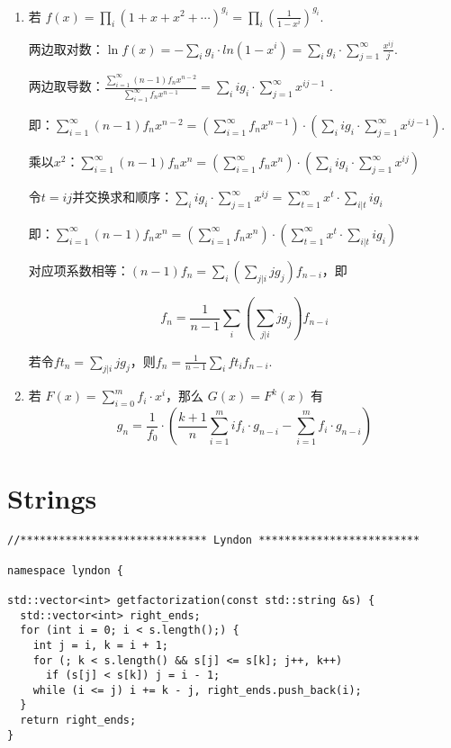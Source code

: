 \documentclass[6pt]{article}
\begin{document}
\begin{multicols}{2}
  \begin{enumerate}
    \item 若 $f(x)=\prod_i(1+x+x^2+\cdots)^{g_i}=\prod_i(\frac1{1-x^i})^{g_i}$.

          两边取对数：$\ln f(x)=-\sum_i g_i\cdot ln(1-x^i)=\sum_ig_i\cdot\sum_{j=1}^\infty\frac{x^{ij}}j$.

          两边取导数：$\frac{\sum_{i=1}^\infty(n-1)f_nx^{n-2}}{\sum_{i=1}^\infty f_nx^{n-1}}=\sum_iig_i\cdot\sum_{j=1}^\infty x^{ij-1}$ .

          即：$\sum_{i=1}^\infty(n-1)f_nx^{n-2}=(\sum_{i=1}^\infty f_nx^{n-1})\cdot(\sum_iig_i\cdot\sum_{j=1}^\infty x^{ij-1})$.

          乘以$x^2$：$\sum_{i=1}^\infty(n-1)f_nx^n=(\sum_{i=1}^\infty f_nx^n)\cdot(\sum_iig_i\cdot\sum_{j=1}^\infty x^{ij})$

          令$t=ij$并交换求和顺序：$\sum_iig_i\cdot\sum_{j=1}^\infty x^{ij}=\sum_{t=1}^\infty x^t\cdot\sum_{i|t}ig_i$

          即：$\sum_{i=1}^\infty(n-1)f_nx^n=(\sum_{i=1}^\infty f_nx^n)\cdot(\sum_{t=1}^\infty x^t\cdot\sum_{i|t}ig_i)$

          对应项系数相等：$(n-1)f_n=\sum_i(\sum_{j|i}jg_j)f_{n-i}$，即

          $$f_n=\frac1{n-1}\sum_i(\sum_{j|i}jg_j)f_{n-i}$$

          若令$ft_n=\sum_{j|i}jg_j$，则$f_n=\frac1{n-1}\sum_ift_if_{n-i}$.
    \item 若 $F(x)=\sum_{i=0}^{m}f_i\cdot x^i$，那么 $G(x)=F^k(x)$ 有
          $$g_n=\frac{1}{f_0}\cdot \left(\frac{k+1}{n}\sum_{i=1}^{m}if_i\cdot g_{n-i}-\sum_{i=1}^{m}f_i\cdot g_{n-i} \right)$$
  \end{enumerate}

  \section{Strings}

  \begin{lstlisting}
//***************************** Lyndon *************************

namespace lyndon {

std::vector<int> getfactorization(const std::string &s) {
  std::vector<int> right_ends;
  for (int i = 0; i < s.length();) {
    int j = i, k = i + 1;
    for (; k < s.length() && s[j] <= s[k]; j++, k++)
      if (s[j] < s[k]) j = i - 1;
    while (i <= j) i += k - j, right_ends.push_back(i);
  }
  return right_ends;
}


\end{lstlisting}
\end{multicols}
\end{document}
